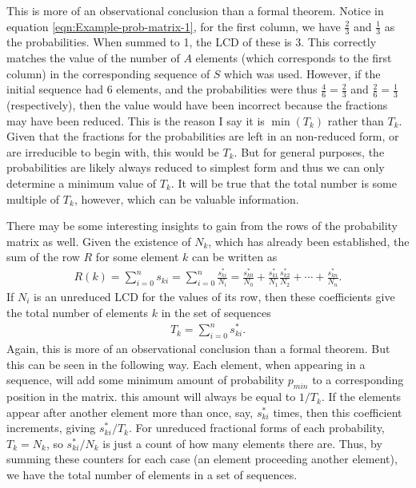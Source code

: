 This is more of an observational conclusion than a formal theorem. Notice in equation \ref{eqn:Example-prob-matrix-1}, for the first column, we have $\frac{2}{3}$ and $\frac{1}{3}$ as the probabilities. When summed to 1, the LCD of these is 3. This correctly matches the value of the number of $A$ elements (which corresponds to the first column) in the corresponding sequence of $S$ which was used. However, if the initial sequence had 6 elements, and the probabilities were thus $\frac{4}{6} = \frac{2}{3}$ and $\frac{2}{6} = \frac{1}{3}$ (respectively), then the value would have been incorrect because the fractions may have been reduced. This is the reason I say it is $\min (T_k)$ rather than $T_k$. Given that the fractions for the probabilities are left in an non-reduced form, or are irreducible to begin with, this would be $T_k$. But for general purposes, the probabilities are likely always reduced to simplest form and thus we can only determine a minimum value of $T_k$. It will be true that the total number is some multiple of $T_k$, however, which can be valuable information.

There may be some interesting insights to gain from the rows of the probability matrix as well. Given the existence of $N_k$, which has already been established, the sum of the row $R$ for some element $k$ can be written as
\begin{align}
	R(k) = \sum_{i=0}^{n} s_{ki} = \sum_{i=0}^{n} \frac{s^*_{ki}}{N_i} = \frac{s^*_{k0}}{N_0} + \frac{s^*_{k1}}{N_1}\frac{s^*_{k2}}{N_2} + \cdots + \frac{s^*_{kn}}{N_n}.
\end{align}
If $N_i$ is an unreduced LCD for the values of its row, then these coefficients give the total number of elements $k$ in the set of sequences
\begin{align}
	T_k = \sum_{i=0}^{n} s^*_{ki}. 
\end{align}
Again, this is more of an observational conclusion than a formal theorem. But this can be seen in the following way. Each element, when appearing in a sequence, will add some minimum amount of probability $p_{min}$ to a corresponding position in the matrix. this amount will always be equal to $1/T_k$. If the elements appear after another element more than once, say, $s^*_{ki}$ times, then this coefficient increments, giving $s^*_{ki}/T_k$. For unreduced fractional forms of each probability, $T_k = N_k$, so $s^*_{ki}/N_k$ is just a count of how many elements there are. Thus, by summing these counters for each case (an element proceeding another element), we have the total number of elements in a set of sequences.


















